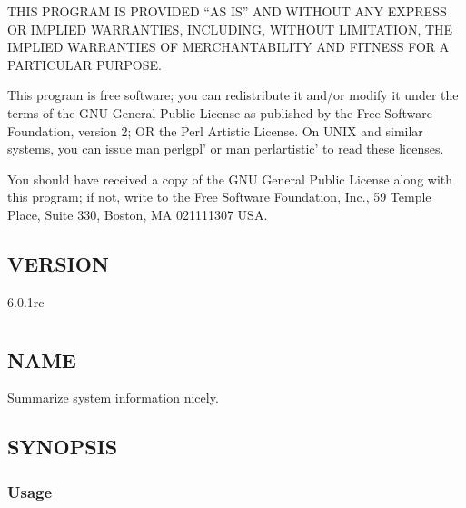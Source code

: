 \documentclass[letterpaper,10pt,english]{sphinxmanual}
\begin{document}
\sphinxAtStartPar
THIS PROGRAM IS PROVIDED “AS IS” AND WITHOUT ANY EXPRESS OR IMPLIED
WARRANTIES, INCLUDING, WITHOUT LIMITATION, THE IMPLIED WARRANTIES OF
MERCHANTABILITY AND FITNESS FOR A PARTICULAR PURPOSE.

\sphinxAtStartPar
This program is free software; you can redistribute it and/or modify it under
the terms of the GNU General Public License as published by the Free Software
Foundation, version 2; OR the Perl Artistic License.  On UNIX and similar
systems, you can issue \textasciigrave{}man perlgpl’ or \textasciigrave{}man perlartistic’ to read these
licenses.

\sphinxAtStartPar
You should have received a copy of the GNU General Public License along with
this program; if not, write to the Free Software Foundation, Inc., 59 Temple
Place, Suite 330, Boston, MA  02111\sphinxhyphen{}1307  USA.


\section{VERSION}
\label{\detokenize{mariadb-summary:version}}
\sphinxAtStartPar
{} 6.0.1rc


\chapter{}
\label{\detokenize{mariadb-system-summary:mariadb-system-summary}}\label{\detokenize{mariadb-system-summary::doc}}

\section{NAME}
\label{\detokenize{mariadb-system-summary:name}}
\sphinxAtStartPar
{} \sphinxhyphen{} Summarize system information nicely.


\section{SYNOPSIS}
\label{\detokenize{mariadb-system-summary:synopsis}}

\subsection{Usage}
\label{\detokenize{mariadb-system-summary:usage}}
\begin{sphinxVerbatim}[commandchars=\\\{\}]
\end{sphinxVerbatim}
\end{document}
